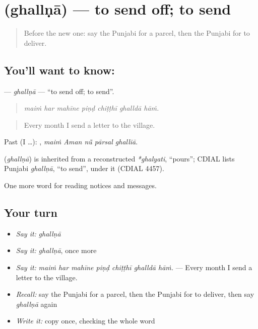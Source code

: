 \section[\texorpdfstring{\pa{ਘੱਲਣਾ} (ghallṇā)}{ਘੱਲਣਾ (ghallṇā)}]{ (ghallṇā) — to send off; to send}

\label{lesson:PA-C256-ghallna}



\begin{quote}
Before the new one: say the Punjabi for a parcel, then the Punjabi for to deliver.
\end{quote}

\subsection*{You'll want to know: }
\textbf{} — \emph{ghallṇā} — \textquotedblleft{}to send off; to send\textquotedblright{}.

\begin{quote}
      
\end{quote}

\begin{quote}
\emph{maiṁ har mahīne piṇḍ chiṭṭhī ghalldā hāṁ.}
\end{quote}

\begin{quote}
Every month I send a letter to the village.
\end{quote}

Past (I …):     , \emph{maiṁ Aman nū̃ pārsal ghalliā}.

\begin{cousinweb}
\textbf{} (\emph{ghallṇā}) is inherited from a reconstructed \emph{*ghalyati}, \textquotedblleft{}pours\textquotedblright{}; CDIAL lists Punjabi \emph{ghallṇā}, \textquotedblleft{}to send\textquotedblright{}, under it (CDIAL 4457).
\end{cousinweb}

\begin{grammarlens}[title={What you've built}]
One more word for reading notices and messages.
\end{grammarlens}

\subsection*{Your turn}
\begin{itemize}
\raggedright
  \item \emph{Say it:} \emph{ghallṇā}
  \item \emph{Say it:} \emph{ghallṇā}, once more
  \item \emph{Say it:} \emph{maiṁ har mahīne piṇḍ chiṭṭhī ghalldā hāṁ.} — Every month I send a letter to the village.
  \item \emph{Recall:} say the Punjabi for a parcel, then the Punjabi for to deliver, then say \emph{ghallṇā} again
  \item \emph{Write it:} copy \textbf{} once, checking the whole word
\end{itemize}

